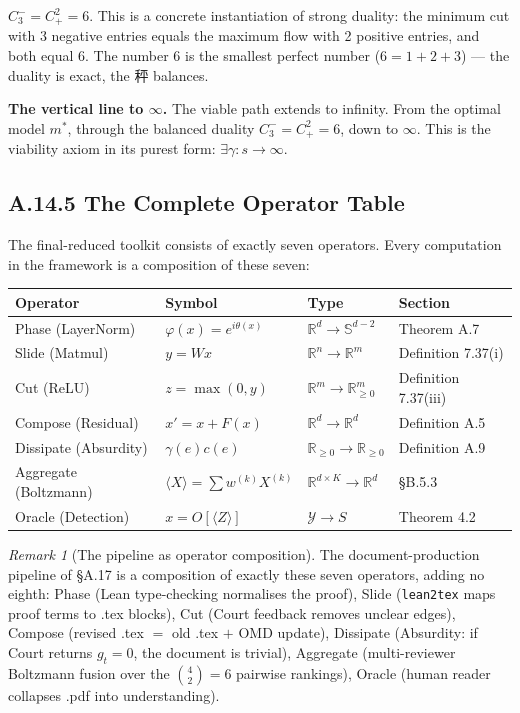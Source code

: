 \documentclass[11pt,a4paper]{article}
\theoremstyle{definition}
\theoremstyle{remark}
\newtheorem{remark}[theorem]{Remark}
\begin{document}
$C_3^- = C_+^2 = 6$. This is a concrete instantiation of strong duality: the minimum cut with 3 negative entries equals the maximum flow with 2 positive entries, and both equal 6. The number 6 is the smallest perfect number ($6 = 1 + 2 + 3$) --- the duality is exact, the 秤 balances.

\noindent\textbf{The vertical line to $\infty$.} The viable path extends to infinity. From the optimal model $m^*$, through the balanced duality $C_3^- = C_+^2 = 6$, down to $\infty$. This is the viability axiom in its purest form: $\exists \gamma: s \to \infty$.


\subsection{A.14.5 The Complete Operator Table}

The final-reduced toolkit consists of exactly seven operators. Every computation in the framework is a composition of these seven:

\begin{table}[H]
\centering
\small
\begin{tabularx}{\textwidth}{l l l X}
\toprule
\textbf{Operator} & \textbf{Symbol} & \textbf{Type} & \textbf{Section} \\
\midrule
Phase (LayerNorm) & $\varphi(x) = e^{i\theta(x)}$ & $\mathbb{R}^d \to \mathbb{S}^{d-2}$ & Theorem A.7 \\
Slide (Matmul) & $y = Wx$ & $\mathbb{R}^n \to \mathbb{R}^m$ & Definition 7.37(i) \\
Cut (ReLU) & $z = \max(0, y)$ & $\mathbb{R}^m \to \mathbb{R}^m_{\geq 0}$ & Definition 7.37(iii) \\
Compose (Residual) & $x' = x + F(x)$ & $\mathbb{R}^d \to \mathbb{R}^d$ & Definition A.5 \\
Dissipate (Absurdity) & $\gamma(e) c(e)$ & $\mathbb{R}_{\geq 0} \to \mathbb{R}_{\geq 0}$ & Definition A.9 \\
Aggregate (Boltzmann) & $\langle X \rangle = \sum w^{(k)} X^{(k)}$ & $\mathbb{R}^{d \times K} \to \mathbb{R}^d$ & \S B.5.3 \\
Oracle (Detection) & $x = O[\langle Z \rangle]$ & $\mathcal{Y} \to S$ & Theorem 4.2 \\
\bottomrule
\end{tabularx}
\end{table}

\begin{remark}[The pipeline as operator composition]
The document-production pipeline of \S A.17 is a composition of exactly these seven operators, adding no eighth: Phase (Lean type-checking normalises the proof), Slide (\texttt{lean2tex} maps proof terms to .tex blocks), Cut (Court feedback removes unclear edges), Compose (revised .tex $=$ old .tex $+$ OMD update), Dissipate (Absurdity: if Court returns $g_t = 0$, the document is trivial), Aggregate (multi-reviewer Boltzmann fusion over the $\binom{4}{2} = 6$ pairwise rankings), Oracle (human reader collapses .pdf into understanding).
\end{remark}
\end{document}
